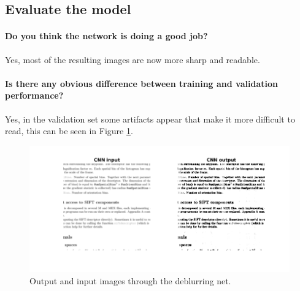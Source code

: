 \documentclass[12pt]{article}
\begin{document}
\subsection{Evaluate the model}
\paragraph{Do you think the network is doing a good job?} Yes, most of the resulting images are now more sharp and readable.
\paragraph{Is there any obvious difference between training and validation performance?}Yes, in the validation set some artifacts appear that make it more difficult to read, this can be seen in Figure \ref{fig:34}.

\begin{figure}[htbp]
 \centering
\includegraphics[width=\textwidth]{234a}
\caption{Output and input images through the deblurring net.}
 \label{fig:34}
\end{figure}
\end{document}
